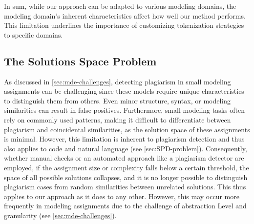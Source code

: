 In sum, while our approach can be adapted to various modeling domains, the modeling domain's inherent characteristics affect how well our method performs. This limitation underlines the importance of customizing tokenization strategies to specific domains.

\subsection*{The Solutions Space Problem}
As discussed in \autoref{sec:mde-challenges}, detecting plagiarism in small modeling assignments can be challenging since these models require unique characteristics to distinguish them from others. Even minor structure, syntax, or modeling similarities can result in false positives. Furthermore, small modeling tasks often rely on commonly used patterns, making it difficult to differentiate between plagiarism and coincidental similarities, as the solution space of these assignments is minimal.
However, this limitation is inherent to plagiarism detection and thus also applies to code and natural language (see \autoref{sec:SPD-problem}). Consequently, whether manual checks or an automated approach like a plagiarism detector are employed, if the assignment size or complexity falls below a certain threshold, the space of all possible solutions collapses, and it is no longer possible to distinguish plagiarism cases from random similarities between unrelated solutions. This thus applies to our approach as it does to any other. However, this may occur more frequently in modeling assignments due to the challenge of abstraction Level and granularity (see \autoref{sec:mde-challenges}).